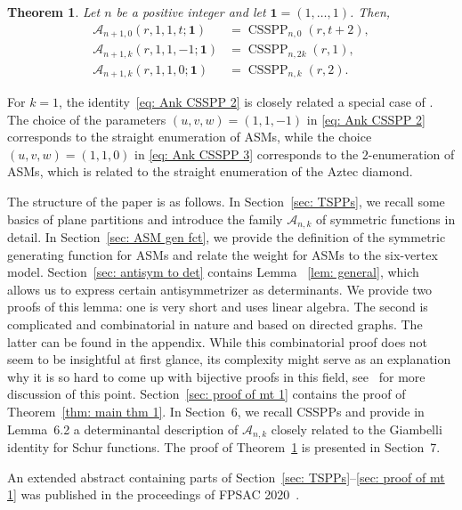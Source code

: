 \documentclass[11pt]{article}
\newtheorem{thm}[theo]{Theorem}
\theoremstyle{definition}
\numberwithin{equation}{section}
\newcommand{\A}{\mathcal{A}}
\DeclareMathOperator{\CSSPP}{CSSPP}
\newcounter{x}
\newcounter{y}
\newcounter{z}
\begin{document}
\begin{thm}
\label{thm: main thm 2}
Let $n$ be a positive integer and let $\mathbf{1}=(1, \ldots, 1)$. Then,
\begin{align}
\label{eq: Ank CSSPP 1}
\A_{n+1,0}(r,1,1,t;\mathbf{1})&=\CSSPP_{n,0}(r,t+2),\\
\label{eq: Ank CSSPP 2}
\A_{n+1,k}(r,1,1,-1;\mathbf{1})&=\CSSPP_{n,2k}(r,1),\\
\label{eq: Ank CSSPP 3}
\A_{n+1,k}(r,1,1,0;\mathbf{1})&=\CSSPP_{n,k}(r,2).
\end{align}
\end{thm}
For $k=1$, the identity~\eqref{eq: Ank CSSPP 2} is closely related a special case of \cite[Theorem 2.6]{FischerSchreierAigner23}. The choice of the parameters $(u,v,w)=(1,1,-1)$ in 
\eqref{eq: Ank CSSPP 2} corresponds to the straight enumeration of ASMs, while the choice $(u,v,w)=(1,1,0)$ in 
\eqref{eq: Ank CSSPP 3} corresponds to the $2$-enumeration of ASMs, which is related to the straight enumeration of the Aztec diamond.

The structure of the paper is as follows. In Section~\ref{sec: TSPPs}, we  recall some basics of plane partitions and introduce the family $\A_{n,k}$ of symmetric functions in detail. In Section~\ref{sec: ASM gen fct}, we provide the definition of the symmetric generating function for ASMs and relate the weight for ASMs to the six-vertex model. Section~\ref{sec: antisym to det} contains Lemma ~\ref{lem: general}, which allows us to express certain antisymmetrizer as determinants. We provide two proofs of this lemma: one is very short and uses linear algebra. The second is complicated and combinatorial in nature and based on directed graphs. The latter can be found in the appendix. While this combinatorial proof does not seem to be insightful at first glance, its complexity might serve as an explanation why it is so hard to come up with bijective proofs in this field, see~\cite{cube} for more discussion of this point. Section~\ref{sec: proof of mt 1} contains the proof of Theorem~\ref{thm: main thm 1}. In Section~6, we recall CSSPPs and provide in Lemma~6.2 a determinantal description of $\A_{n,k}$ closely related to the Giambelli identity for Schur functions. The proof of Theorem~\ref{thm: main thm 2} is presented in Section~7.

An extended abstract containing parts of Section~\ref{sec: TSPPs}--\ref{sec: proof of mt 1} was published in the proceedings of FPSAC 2020~\cite{AignerFischerKonvalinkaNadeauTewari20}.
\end{document}

